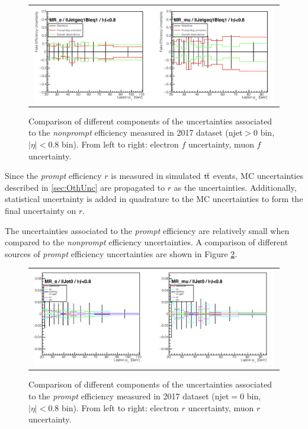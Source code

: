 \begin{figure}[tbh!]
 \begin{center}
 \begin{tabular}{c}
 \includegraphics[width=0.99\textwidth]{figures/Part3/Systematics/MR2}
 \end{tabular}
 \caption{Comparison of different components of the uncertainties associated to the \emph{nonprompt} efficiency measured in 2017 dataset (njet$>$0 bin, $|\eta|<$0.8 bin). From left to right: electron $f$ uncertainty, muon $f$ uncertainty.}
 \label{fig:f_comp2}
 \end{center}
\end{figure}

Since the \emph{prompt} efficiency $r$ is measured in simulated $\textsf{t}\overline{\textsf{t}}$ events, \ac{MC} uncertainties described in \autoref{sec:OthUnc} are propagated to $r$ as the uncertainties. Additionally, statistical uncertainty is added in quadrature to the MC uncertainties to form the final uncertainty on $r$.

The uncertainties associated to the \emph{prompt} efficiency are relatively small when compared to the \emph{nonprompt} efficiency uncertainties. A comparison of different sources of \emph{prompt} efficiency uncertainties are shown in Figure \ref{fig:r_comp}.

\begin{figure}[tbh!]
 \begin{center}
 \begin{tabular}{c}
 \includegraphics[width=0.99\textwidth]{figures/Part3/Systematics/MR}
 \end{tabular}
 \caption{Comparison of different components of the uncertainties associated to the \emph{prompt} efficiency measured in 2017 dataset (njet$=$0 bin, $|\eta|<$0.8 bin). From left to right: electron $r$ uncertainty, muon $r$ uncertainty.}
 \label{fig:r_comp}
 \end{center}
\end{figure}

